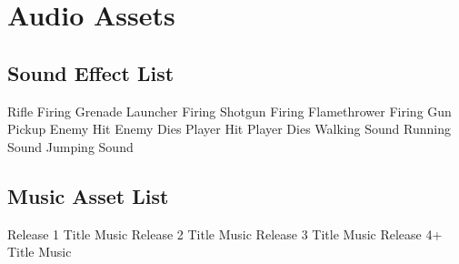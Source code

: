 \documentclass[11pt,fleqn]{book} %
\begin{document}

\chapter{Audio Assets}

\section{Sound Effect List}
\begin{flushleft}
	\begin{outline}
		\1 Rifle Firing
		\1 Grenade Launcher Firing
		\1 Shotgun Firing
		\1 Flamethrower Firing
		\1 Gun Pickup
		\1 Enemy Hit
		\1 Enemy Dies
		\1 Player Hit
		\1 Player Dies
		\1 Walking Sound
		\1 Running Sound
		\1 Jumping Sound
	\end{outline}
\end{flushleft}

\section{Music Asset List}
\begin{flushleft}
	\begin{outline}
		\1 Release 1 Title Music
		\1 Release 2 Title Music
		\1 Release 3 Title Music
		\1 Release 4+ Title Music
	\end{outline}
\end{flushleft}


%
\end{document}

